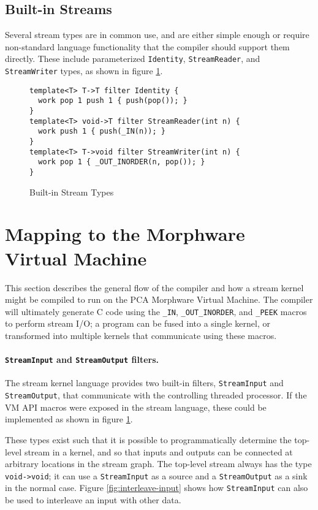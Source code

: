 \documentclass[11pt]{article}
\begin{document}
\subsection{Built-in Streams}
\label{sec:built-in-streams}

Several stream types are in common use, and are either simple enough
or require non-standard language functionality that the compiler
should support them directly.  These include parameterized
\texttt{Identity}, \texttt{StreamReader}, and \texttt{StreamWriter}
types, as shown in figure \ref{fig:built-in-streams}.

\begin{figure}[htbp]
    \begin{verbatim}
template<T> T->T filter Identity {
  work pop 1 push 1 { push(pop()); }
}
template<T> void->T filter StreamReader(int n) {
  work push 1 { push(_IN(n)); }
}
template<T> T->void filter StreamWriter(int n) {
  work pop 1 { _OUT_INORDER(n, pop()); }
}
\end{verbatim}
    \caption{Built-in Stream Types}
    \label{fig:built-in-streams}
\end{figure}

\section{Mapping to the Morphware Virtual Machine}

This section describes the general flow of the compiler and how a
stream kernel might be compiled to run on the PCA Morphware Virtual
Machine.  The compiler will ultimately generate C code using the
\texttt{\_IN}, \texttt{\_OUT\_INORDER}, and \texttt{\_PEEK} macros to
perform stream I/O; a program can be fused into a single kernel, or
transformed into multiple kernels that communicate using these macros.

\paragraph{\texttt{StreamInput} and \texttt{StreamOutput} filters.}
The stream kernel language provides two built-in filters,
\texttt{StreamInput} and \texttt{StreamOutput}, that communicate with
the controlling threaded processor.  If the VM API macros were exposed
in the stream language, these could be implemented as shown in figure
\ref{fig:built-in-streams}.

These types exist such that it is possible to programmatically
determine the top-level stream in a kernel, and so that inputs and
outputs can be connected at arbitrary locations in the stream graph.
The top-level stream always has the type \texttt{void->void}; it can
use a \texttt{StreamInput} as a source and a \texttt{StreamOutput} as
a sink in the normal case.  Figure \ref{fig:interleave-input} shows
how \texttt{StreamInput} can also be used to interleave an input with
other data.
\end{document}
